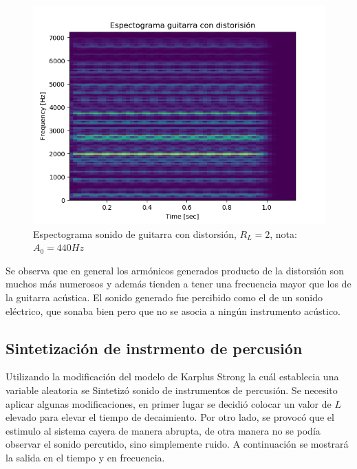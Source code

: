 \documentclass[assd_tp2_main.tex]{subfiles}
\begin{document}
\begin{figure}[H]
	\begin{center}
	\includegraphics[scale=0.5]{graficos/espectograma_guitarra_distorsion.png}
	\caption{Espectograma sonido de guitarra con distorsión, $R_L=2$, nota: $A_0=440 Hz$}

	\end{center}
\end{figure}
Se observa que en general los armónicos generados producto de la distorsión son muchos más numerosos y además tienden a tener una frecuencia mayor que los de la guitarra acústica. 
El sonido generado fue percibido como el de un sonido eléctrico, que sonaba bien pero que no se asocia a ningún instrumento acústico.
 
\subsection{Sintetización de instrmento de percusión}

Utilizando la modificación del modelo de Karplus Strong la cuál establecia una variable aleatoria se Sintetizó sonido de instrumentos de percusión. Se necesito aplicar algunas modificaciones, en primer lugar se decidió colocar un valor de $L$ elevado para elevar el tiempo de decaimiento. Por otro lado, se provocó que el estimulo al sistema cayera de manera abrupta, de otra manera no se podía observar el sonido percutido, sino simplemente ruido. A continuación se mostrará la salida en el tiempo y en frecuencia.
\end{document}
